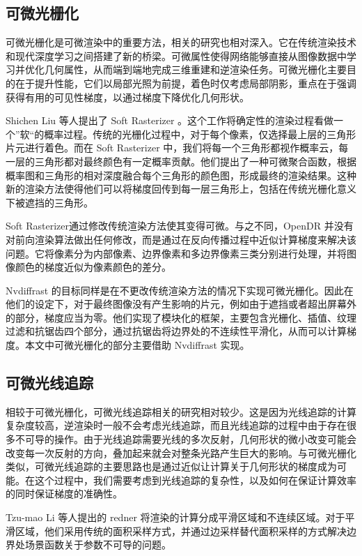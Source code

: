 \subsection{可微光栅化}

可微光栅化是可微渲染中的重要方法，相关的研究也相对深入。它在传统渲染技术和现代深度学习之间搭建了新的桥梁。可微属性使得网络能够直接从图像数据中学习并优化几何属性，从而端到端地完成三维重建和逆渲染任务。可微光栅化主要目的在于提升性能，它们以局部光照为前提，着色时仅考虑局部阴影，重点在于强调获得有用的可见性梯度，以通过梯度下降优化几何形状。

Shichen Liu 等人提出了 Soft Rasterizer \cite{softraster}。这个工作将确定性的渲染过程看做一个”软“的概率过程。传统的光栅化过程中，对于每个像素，仅选择最上层的三角形片元进行着色。而在 Soft Rasterizer 中，我们将每一个三角形都视作概率云，每一层的三角形都对最终颜色有一定概率贡献。他们提出了一种可微聚合函数，根据概率图和三角形的相对深度融合每个三角形的颜色图，形成最终的渲染结果。这种新的渲染方法使得他们可以将梯度回传到每一层三角形上，包括在传统光栅化意义下被遮挡的三角形。

Soft Rasterizer通过修改传统渲染方法使其变得可微。与之不同，OpenDR \cite{OpenDR} 并没有对前向渲染算法做出任何修改，而是通过在反向传播过程中近似计算梯度来解决该问题。它将像素分为内部像素、边界像素和多边界像素三类分别进行处理，并将图像颜色的梯度近似为像素颜色的差分。

Nvdiffrast \cite{nvdiffrast} 的目标同样是在不更改传统渲染方法的情况下实现可微光栅化。因此在他们的设定下，对于最终图像没有产生影响的片元，例如由于遮挡或者超出屏幕外的部分，梯度应当为零。他们实现了模块化的框架，主要包含光栅化、插值、纹理过滤和抗锯齿四个部分，通过抗锯齿将边界处的不连续性平滑化，从而可以计算梯度。本文中可微光栅化的部分主要借助 Nvdiffrast 实现。

\subsection{可微光线追踪}

相较于可微光栅化，可微光线追踪相关的研究相对较少。这是因为光线追踪的计算复杂度较高，逆渲染时一般不会考虑光线追踪，而且光线追踪的过程中由于存在很多不可导的操作。由于光线追踪需要光线的多次反射，几何形状的微小改变可能会改变每一次反射的方向，叠加起来就会对整条光路产生巨大的影响。与可微光栅化类似，可微光线追踪的主要思路也是通过近似让计算关于几何形状的梯度成为可能。在这个过程中，我们需要考虑到光线追踪的复杂性，以及如何在保证计算效率的同时保证梯度的准确性。

Tzu-mao Li 等人提出的 redner \cite{DiffMCRT} 将渲染的计算分成平滑区域和不连续区域。对于平滑区域，他们采用传统的面积采样方式，并通过边采样替代面积采样的方式解决边界处场景函数关于参数不可导的问题。

